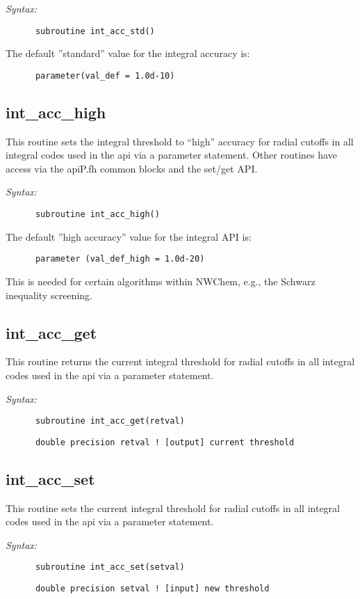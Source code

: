{\it Syntax:} 
\begin{verbatim} 
      subroutine int_acc_std() 
\end{verbatim} 
The default ''standard'' value for the integral accuracy is: 
\begin{verbatim} 
      parameter(val_def = 1.0d-10) 
\end{verbatim} 
\subsection{int\_acc\_high} 
This routine sets the integral threshold to ``high'' accuracy  
for radial cutoffs in all integral codes used in the api via a  
parameter statement.  Other routines have access via the apiP.fh  
common blocks and the set/get API. 
 
{\it Syntax:} 
\begin{verbatim} 
      subroutine int_acc_high() 
\end{verbatim} 
The default ''high accuracy'' value for the integral API is: 
\begin{verbatim} 
      parameter (val_def_high = 1.0d-20) 
\end{verbatim} 
This is needed for certain algorithms within NWChem, e.g.,  
the Schwarz inequality screening. 
 
\subsection{int\_acc\_get} 
This routine returns the current integral threshold  
for radial cutoffs in all integral codes used in the api via a  
parameter statement.   
 
{\it Syntax:} 
\begin{verbatim} 
      subroutine int_acc_get(retval) 
\end{verbatim} 
\begin{verbatim} 
      double precision retval ! [output] current threshold 
\end{verbatim} 
\subsection{int\_acc\_set} 
This routine sets the current integral threshold  
for radial cutoffs in all integral codes used in the api via a  
parameter statement.   
 
{\it Syntax:} 
\begin{verbatim} 
      subroutine int_acc_set(setval) 
\end{verbatim} 
\begin{verbatim} 
      double precision setval ! [input] new threshold 
\end{verbatim} 
